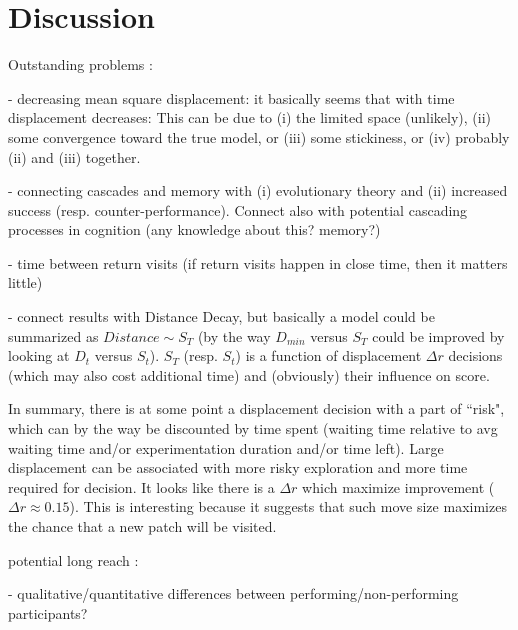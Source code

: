 \section{Discussion}

Outstanding problems :

- decreasing mean square displacement: it basically seems that with time displacement decreases: This can be due to (i) the limited space (unlikely), (ii) some convergence toward the true model, or (iii) some stickiness, or (iv) probably (ii) and (iii) together.
  
- connecting cascades and memory with (i) evolutionary theory and (ii) increased success (resp. counter-performance). Connect also with potential cascading processes in cognition (any knowledge about this? memory?)

- time between return visits (if return visits happen in close time, then it matters little)

- connect results with Distance Decay, but basically a model could be summarized as $Distance \sim S_T$ (by the way $D_{min}$ versus $S_T$ could be improved by looking at $D_t$ versus $S_t$). $S_T$ (resp. $S_t$) is a function of displacement $\Delta r$ decisions (which may also cost additional time) and (obviously) their influence on score. 

In summary, there is at some point a displacement decision with a part of ``risk", which can by the way be discounted by time spent (waiting time relative to avg waiting time and/or experimentation duration and/or time left). Large displacement can be associated with more risky exploration and more time required for decision. It looks like there is a $\Delta r$ which maximize improvement ($\Delta r \approx 0.15$). This is interesting because it suggests that such move size maximizes the chance that a new patch will be visited.


potential long reach :

- qualitative/quantitative differences between performing/non-performing participants?












